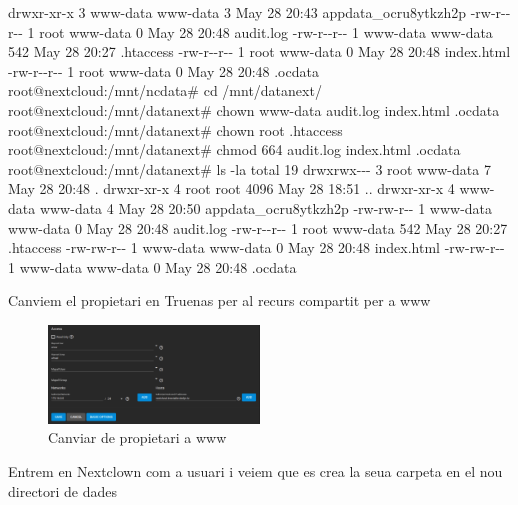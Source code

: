 \documentclass[
  10pt,
]{krantz}
\newenvironment{Shaded}{\begin{snugshade}}{\end{snugshade}}
\newcommand{\AttributeTok}[1]{\textcolor[rgb]{0.77,0.63,0.00}{#1}}
\newcommand{\ExtensionTok}[1]{#1}
\newcommand{\NormalTok}[1]{#1}
\begin{document}
\begin{Shaded}
\begin{Highlighting}[]
\ExtensionTok{drwxr{-}xr{-}x}\NormalTok{ 3 www{-}data www{-}data    3 May 28 20:43 appdata\_ocru8ytkzh2p}
\ExtensionTok{{-}rw{-}r{-}{-}r{-}{-}}\NormalTok{ 1 root     www{-}data    0 May 28 20:48 audit.log}
\ExtensionTok{{-}rw{-}r{-}{-}r{-}{-}}\NormalTok{ 1 www{-}data www{-}data  542 May 28 20:27 .htaccess}
\ExtensionTok{{-}rw{-}r{-}{-}r{-}{-}}\NormalTok{ 1 root     www{-}data    0 May 28 20:48 index.html}
\ExtensionTok{{-}rw{-}r{-}{-}r{-}{-}}\NormalTok{ 1 root     www{-}data    0 May 28 20:48 .ocdata}
\ExtensionTok{root@nextcloud:/mnt/ncdata\#}\NormalTok{ cd /mnt/datanext/}
\ExtensionTok{root@nextcloud:/mnt/datanext\#}\NormalTok{ chown www{-}data audit.log index.html .ocdata }
\ExtensionTok{root@nextcloud:/mnt/datanext\#}\NormalTok{ chown root .htaccess }
\ExtensionTok{root@nextcloud:/mnt/datanext\#}\NormalTok{ chmod 664 audit.log index.html .ocdata}
\ExtensionTok{root@nextcloud:/mnt/datanext\#}\NormalTok{ ls }\AttributeTok{{-}la}
\ExtensionTok{total}\NormalTok{ 19}
\ExtensionTok{drwxrwx{-}{-}{-}}\NormalTok{ 3 root     www{-}data    7 May 28 20:48 .}
\ExtensionTok{drwxr{-}xr{-}x}\NormalTok{ 4 root     root     4096 May 28 18:51 ..}
\ExtensionTok{drwxr{-}xr{-}x}\NormalTok{ 4 www{-}data www{-}data    4 May 28 20:50 appdata\_ocru8ytkzh2p}
\ExtensionTok{{-}rw{-}rw{-}r{-}{-}}\NormalTok{ 1 www{-}data www{-}data    0 May 28 20:48 audit.log}
\ExtensionTok{{-}rw{-}r{-}{-}r{-}{-}}\NormalTok{ 1 root     www{-}data  542 May 28 20:27 .htaccess}
\ExtensionTok{{-}rw{-}rw{-}r{-}{-}}\NormalTok{ 1 www{-}data www{-}data    0 May 28 20:48 index.html}
\ExtensionTok{{-}rw{-}rw{-}r{-}{-}}\NormalTok{ 1 www{-}data www{-}data    0 May 28 20:48 .ocdata}
\end{Highlighting}
\end{Shaded}

Canviem el propietari en Truenas per al recurs compartit per a www

\begin{figure}
\centering
\includegraphics[width=0.5\textwidth,height=\textheight]{imatges/proxmox/datanext_www.png}
\caption{Canviar de propietari a www}
\end{figure}

Entrem en Nextclown com a usuari i veiem que es crea la seua carpeta en el nou directori de dades
\end{document}
